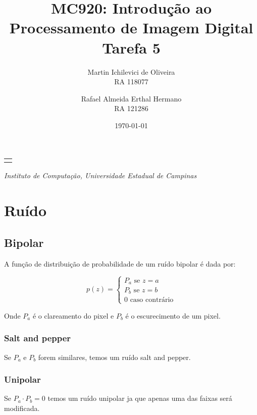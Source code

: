 \documentclass[10pt,a4paper]{article}
\makeatletter
\let\@institution\empty
\def\institution#1{\def\@institution{#1}}
\renewcommand{\maketitle}{
    \begin{center}
        {\Large\bfseries\@title\par\medskip}
        {\large
            \begin{tabular}[t]{c}%
                \@author
        \end{tabular}\par\medskip}
        {\itshape\@institution\par}
        {\itshape\@date\par}
\end{center}}
\makeatother
\begin{document}

\title{MC920: Introdução ao Processamento de Imagem Digital\\Tarefa 5}
\author{
    \begin{minipage}{6cm}
        \centering
        Martin Ichilevici de Oliveira\\
        RA 118077
    \end{minipage}
    \and
    \begin{minipage}{6cm}
        \centering
        Rafael Almeida Erthal Hermano\\
        RA 121286
    \end{minipage}
}
\institution{Instituto de Computação, Universidade Estadual de Campinas}
\date{\today}

\maketitle


\section{Ruído}
\subsection{Bipolar}
A função de distribuição de probabilidade de um ruído bipolar é dada por:

\begin{equation}
p(z) = \left\{
    \begin{array}{l}
        P_a \text{ se } z = a \\
        P_b \text{ se } z = b \\
        0 \text{ caso contrário}
    \end{array}\right.
\end{equation}

Onde $P_a$ é o clareamento do pixel e $P_b$ é o escurecimento de um pixel.

\subsubsection{Salt and pepper}
Se $P_a$ e $P_b$ forem similares, temos um ruído salt and pepper.

\subsubsection{Unipolar}
Se $P_a \cdot P_b = 0$ temos um ruído unipolar ja que apenas uma das faixas será modificada.
\end{document}
